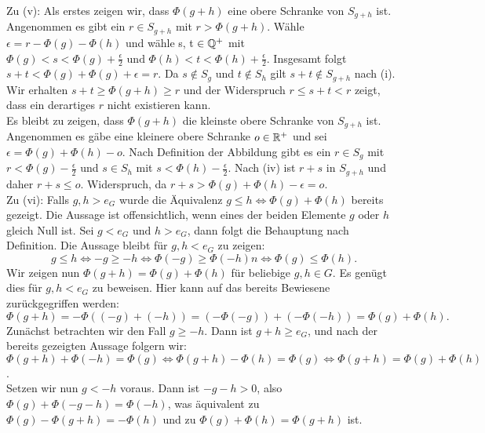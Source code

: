 {Zu (v): Als erstes zeigen wir, dass $\Phi\left(g + h\right)$ eine obere Schranke von $S_{g+h}$ ist. Angenommen es gibt ein $r\in S_{g+h}$ mit $r > \Phi\left(g + h\right)$. Wähle $\epsilon = r - \Phi\left(g\right) - \Phi\left(h\right)$ und wähle s, t $\in \mathbb{Q}^{+}$ mit $\Phi(g) < s < \Phi(g) + \frac{\epsilon}{2} \text{ und } \Phi\left(h\right) < t < \Phi\left(h\right) +\frac{\epsilon}{2}$. Insgesamt folgt $s + t < \Phi\left(g\right) + \Phi\left(g\right) + \epsilon = r$. Da $s \notin S_g$ und $t \notin S_h$ gilt $s+t \notin S_{g+h}$ nach (i). Wir erhalten $s+ t \geq \Phi\left(g+h\right) \geq r$ und der Widerspruch $ r \le s+t < r$ zeigt, dass ein derartiges $r$ nicht existieren kann.\\
Es bleibt zu zeigen, dass $\Phi\left(g + h\right)$ die kleinste obere Schranke von $S_{g+h}$ ist. Angenommen es gäbe eine kleinere obere Schranke $ o \in \mathbb{R}^{+}$ und sei $\epsilon = \Phi(g) + \Phi(h) - o$. Nach Definition der Abbildung gibt es ein $r\in S_g$ mit $r < \Phi(g) - \frac{\epsilon}{2}$ und $ s \in S_h$ mit $s < \Phi(h) - \frac{\epsilon}{2}.$ Nach (iv) ist $r+s$ in $S_{g+h} $ und daher $ r +s \le o$. Widerspruch, da $r+s >\Phi(g) + \Phi(h) - \epsilon = o$.\\
Zu (vi): Falls $g, h > e_{G}$ wurde die Äquivalenz $g\le h \Leftrightarrow \Phi(g) + \Phi(h)$ bereits gezeigt. Die Aussage ist offensichtlich, wenn eines der beiden Elemente $g$ oder $h$ gleich Null ist. Sei $g < e_G \text{ und } h > e_G$, dann folgt die Behauptung nach Definition. Die Aussage bleibt für $g, h < e_G$ zu zeigen: 
\[g \le h \Leftrightarrow -g \geq -h \Leftrightarrow \Phi\left(-g\right) \geq \Phi\left(-h\right)n \Leftrightarrow \Phi\left(g\right) \le \Phi\left(h\right).\]
Wir zeigen nun $\Phi(g+h) = \Phi\left(g\right) +\Phi\left(h\right)$ für beliebige $g,h \in G$. Es genügt dies für $g, h < e_G$ zu beweisen. Hier kann auf das bereits Bewiesene zurückgegriffen werden: 
\[\Phi\left(g+h\right) = −\Phi\left((−g)+(−h)\right) = (−\Phi(−g))+(−\Phi(−h)) = \Phi(g)+\Phi(h).\]
Zunächst betrachten wir den Fall $g\geq −h$. Dann ist $g+h \geq e_G$, und nach der bereits gezeigten Aussage folgern wir:\\
$\Phi(g+h)+ \Phi(−h) = \Phi(g) \Leftrightarrow \Phi(g+h)−\Phi(h) = \Phi(g) \Leftrightarrow \Phi(g+h) = \Phi(g)+ \Phi(h)$.\\
Setzen wir nun $g < −h$ voraus. Dann ist $−g−h > 0$, also $\Phi(g)+\Phi(−g−h) = \Phi(−h)$, was äquivalent zu $\Phi(g)−\Phi(g+h) = −\Phi(h)$ und zu $\Phi(g)+ \Phi(h) = \Phi(g+ h)$ ist.
}
